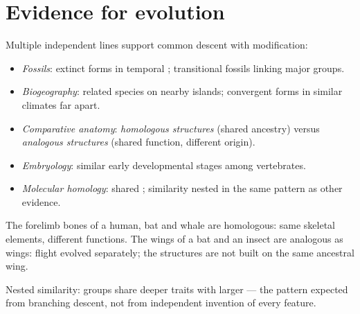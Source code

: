 \section{Evidence for evolution}

\begin{proposition}\label{prop:g11:evolution-mechanisms:evidence}
Multiple independent lines support common descent with modification:
\begin{itemize}
  \item \emph{Fossils}: extinct forms in temporal ; transitional
        fossils linking major groups.
  \item \emph{Biogeography}: related species on nearby
        islands; convergent forms in similar climates far apart.
  \item \emph{Comparative anatomy}: \emph{homologous structures} (shared ancestry) versus \emph{analogous
        structures} (shared function, different origin).
  \item \emph{Embryology}: similar early developmental stages among vertebrates.
  \item \emph{Molecular homology}: shared ;  similarity
        nested in the same pattern as other evidence.
\end{itemize}
\end{proposition}
\admitted

\begin{example}\label{ex:g11:evolution-mechanisms:homology}
The forelimb bones of a human, bat and whale are homologous: same skeletal
elements, different functions. The wings of a bat and an insect are analogous as
wings: flight evolved separately; the structures are not built on the same
ancestral wing.
\end{example}

\begin{omfigure}

{\small Nested similarity: groups share deeper traits with larger  --- the
pattern expected from branching descent, not from independent invention of every
feature.}
\end{omfigure}

